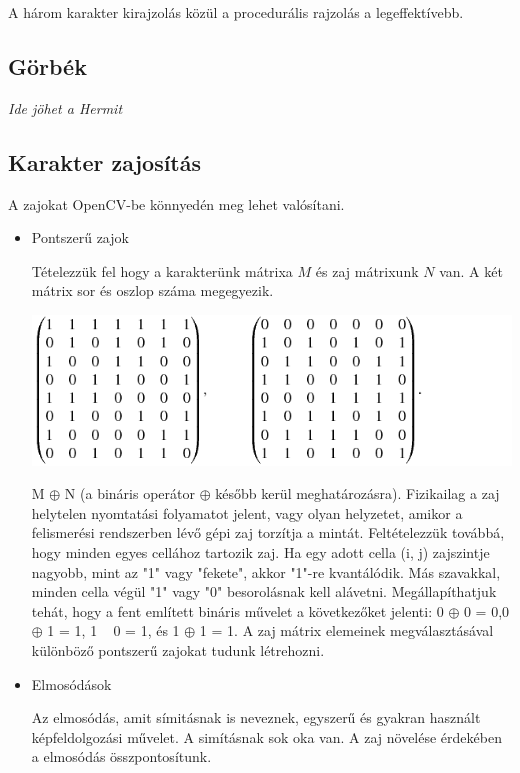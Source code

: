A három karakter kirajzolás közül a procedurális rajzolás a legeffektívebb.

\subsection{Görbék}
\textit{Ide jöhet a Hermit}

\subsection{Karakter zajosítás \cite{WANG1973303}}

A zajokat OpenCV-be \cite{OpenCVli86} könnyedén meg lehet valósítani.

\begin{itemize}
\item Pontszerű zajok

Tételezzük fel hogy a karakterünk mátrixa $M$ és zaj mátrixunk $N$ van. A két mátrix sor és oszlop száma megegyezik.

\begin{center}
\includegraphics[scale=0.6]{images/noise_matrix}
\end{center}

M $\oplus$ N (a bináris operátor $\oplus$ később kerül meghatározásra). Fizikailag a zaj helytelen nyomtatási folyamatot jelent, vagy olyan helyzetet, amikor a felismerési rendszerben lévő gépi zaj torzítja a mintát. Feltételezzük továbbá, hogy minden egyes cellához tartozik zaj.
Ha egy adott cella (i, j) zajszintje nagyobb, mint az "1" vagy "fekete", akkor "1"-re kvantálódik. Más szavakkal, minden cella végül "1" vagy "0" besorolásnak kell alávetni. Megállapíthatjuk tehát, hogy a fent említett bináris művelet a következőket jelenti: 0 $\oplus$ 0 = 0,0 $\oplus$ 1 = 1, 1 ~ 0 = 1, és 1 $\oplus$ 1 = 1.
A zaj mátrix elemeinek megválasztásával különböző pontszerű zajokat tudunk létrehozni.
\item Elmosódások

Az elmosódás, amit símitásnak is neveznek, egyszerű és gyakran használt képfeldolgozási művelet. A simításnak sok oka van. A zaj növelése érdekében a elmosódás összpontosítunk.


\end{itemize}
